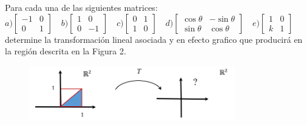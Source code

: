 \documentclass[12pt]{article}
\begin{document}
Para cada una de las siguientes matrices:\\
$
    a)  
    \begin{bmatrix}
        -1 & 0 \\
         0 & 1
    \end{bmatrix}
    \quad
    b)  
    \begin{bmatrix}
         1 &  0 \\
         0 & -1
    \end{bmatrix}
    \quad
    c)  
    \begin{bmatrix}
         0 & 1 \\
         1 & 0
    \end{bmatrix}
    \quad
    d)  
    \begin{bmatrix}
         \cos{\theta} & -\sin{\theta} \\
         \sin{\theta} &  \cos{\theta}
    \end{bmatrix}
    \quad
    e)
    \begin{bmatrix}
         1 & 0 \\
         k & 1
    \end{bmatrix}
$\\
determine la transformación lineal asociada y en efecto grafico que producirá en la región descrita en
la Figura 2.
\begin{figure}[htbp]
    \centering
    \includegraphics[width=0.8\textwidth]{problema17.png}
\end{figure}
\end{document}
